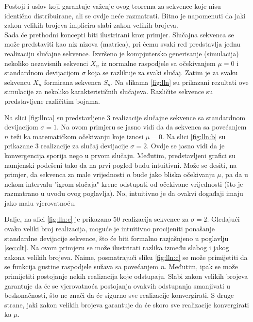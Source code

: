 Postoji i uslov koji garantuje važenje ovog teorema za sekvence koje nisu
identično distribuirane, ali se ovdje neće razmatrati. Bitno je napomenuti da
jaki zakon velikih brojeva implicira slabi zakon velikih brojeva. \\

Sada će prethodni koncepti biti ilustrirani kroz primjer. Slučajna sekvenca se
može predstaviti kao niz nizova (matrica), pri čemu svaki red predstavlja jednu
realizaciju slučajne sekvence. Izvršeno je kompjutersko generisanje (simulacija)
nekoliko nezavisnih sekvenci $X_n$ iz normalne raspodjele sa očekivanjem $\mu=0$
i standardnom devijacijom $\sigma$ koja se razlikuje za svaki slučaj.  Zatim je
za svaku sekvencu $X_n$ formirana sekvenca $S_n$. Na slikama \ref{fig:lln} su
prikazani rezultati ove simulacije za nekoliko karakterističnih slučajeva.
Različite sekvence su predstavljene različitim bojama.

Na slici \ref{fig:lln:a} su predstavljene 3 realizacije slučajne sekvence sa
standardnom devijacijom $\sigma=1$. Na ovom primjeru se jasno vidi da da
sekvenca sa povećanjem $n$ teži ka matematičkom očekivanju koje iznosi $\mu=0$.
Na slici \ref{fig:lln:b} su prikazane 3 realizacije za slučaj devijacije
$\sigma=2$. Ovdje se jasno vidi da je konvergencija sporija nego u prvom
slučaju. Međutim, predstavljeni grafici su namjenski podešeni tako da na prvi
pogled budu intuitivni. Može se desiti, na primjer, da sekvenca za male
vrijednosti $n$ bude jako bliska očekivanju $\mu$, pa da u nekom intervalu
"igrom slučaja" krene odstupati od očekivane vrijednosti (što je razmatrano u
uvodu ovog poglavlja). No, intuitivno je da ovakvi događaji imaju jako malu
vjerovatnoću.

Dalje, na slici \ref{fig:lln:c} je prikazano 50 realizacija sekvence za
$\sigma=2$. Gledajući ovako veliki broj realizacija, moguće je intuitivno
procijeniti ponašanje standardne devijacije sekvence, što će biti formalno
razjašnjeno u poglavlju \ref{sec:clt}. Na ovom primjeru se može ilustrirati
razlika između slabog i jakog zakona velikih brojeva. Naime, posmatrajući sliku
\ref{fig:lln:c} se može primijetiti da se funkcija gustine raspodjele sužava sa
povećanjem $n$. Međutim, ipak se može primijetiti postojanje nekih
realizacija koje odstupaju. Slabi zakon velikih brojeva garantuje da će se
vjerovatnoća postojanja ovakvih odstupanja smanjivati u beskonačnosti, što ne
znači da će sigurno sve realizacije konvergirati.  S druge strane, jaki zakon
velikih brojeva garantuje da će skoro sve realizacije konvergirati ka $\mu$.

